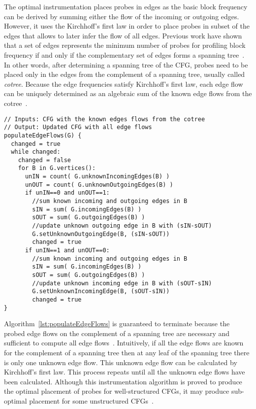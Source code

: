 The optimal instrumentation places probes in edges as the basic block frequency can be derived by summing either the flow of the incoming or outgoing edges.
However, it uses the Kirchhoff's first law in order to place probes in subset of the edges that allows to later infer the flow of all edges.
Previous work have shown that a set of edges represents the minimum number of probes for profiling block frequency if and only if the complementary set of edges forms a spanning tree~\citep{nahapetian73,ball94}.
In other words, after determining a spanning tree of the CFG, probes need to be placed only in the edges from the complement of a spanning tree, usually called \textit{cotree}.
Because the edge frequencies satisfy Kirchhoff's first law, each edge flow can be uniquely determined as an algebraic sum of the known edge flows from the cotree~\citep{nahapetian73,ball94}.

\begin{lstlisting}[caption={A data-flow analysis for populating all edge flows based on the probed edges.}, label={lst:populateEdgeFlows}, float]
// Inputs: CFG with the known edges flows from the cotree
// Output: Updated CFG with all edge flows
populateEdgeFlows(G) {
  changed = true
  while changed:
    changed = false
    for B in G.vertices():
      unIN = count( G.unknownIncomingEdges(B) )
      unOUT = count( G.unknownOutgoingEdges(B) )
      if unIN==0 and unOUT==1:
        //sum known incoming and outgoing edges in B
        sIN = sum( G.incomingEdges(B) )
        sOUT = sum( G.outgoingEdges(B) )
        //update unknown outgoing edge in B with (sIN-sOUT)
        G.setUnknownOutgoingEdge(B, (sIN-sOUT))
        changed = true
      if unIN==1 and unOUT==0:
        //sum known incoming and outgoing edges in B
        sIN = sum( G.incomingEdges(B) )
        sOUT = sum( G.outgoingEdges(B) )
        //update unknown incoming edge in B with (sOUT-sIN)
        G.setUnknownIncomingEdge(B, (sOUT-sIN))
        changed = true
}
\end{lstlisting}

Algorithm~\ref{lst:populateEdgeFlows} is guaranteed to terminate because the probed edge flows on the complement of a spanning tree are necessary and sufficient to compute all edge flows~\citep{nahapetian73,forman81}.
Intuitively, if all the edge flows are known for the complement of a spanning tree then at any leaf of the spanning tree there is only one unknown edge flow.
This unknown edge flow can be calculated by Kirchhoff's first law.
This process repeats until all the unknown edge flows have been calculated.
Although this instrumentation algorithm is proved to produce the optimal placement of probes for well-structured CFGs, it may produce sub-optimal placement for some unstructured CFGs~\citep{ball94}.

